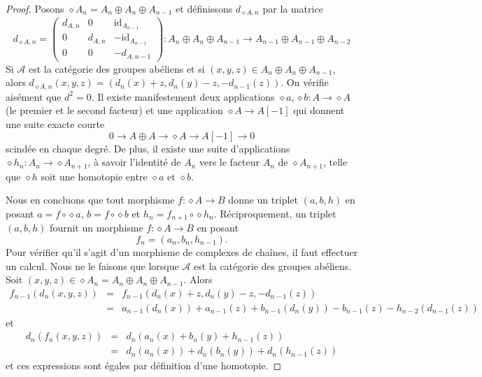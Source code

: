 \begin{proof}
Posons $\diamond A_n = A_n \oplus A_n \oplus A_{n - 1}$ et
définissons $d_{\diamond A, n}$ par la matrice
$$
d_{\diamond A, n}
=
\left(
\begin{matrix}
d_{A, n} & 0 & \text{id}_{A_{n - 1}} \\
0 & d_{A, n} & -\text{id}_{A_{n - 1}} \\
0 & 0 & -d_{A, n - 1}
\end{matrix}
\right) :
A_n \oplus A_n \oplus A_{n - 1} \to
A_{n - 1} \oplus A_{n - 1} \oplus A_{n - 2}
$$
Si $\mathcal{A}$ est la catégorie des groupes abéliens et si
$(x, y, z) \in A_n \oplus A_n \oplus A_{n - 1}$, alors
$d_{\diamond A, n}(x, y, z) = (d_n(x) + z, d_n(y) - z, -d_{n - 1}(z))$.
On vérifie aisément que $d^2 = 0$. Il existe manifestement deux applications
$\diamond a, \diamond b : A \to \diamond A$ (le premier et le second facteur)
et une application $\diamond A \to A[-1]$ qui donnent une suite exacte courte
$$
0 \to
A \oplus A \to
\diamond A \to
A[-1] \to
0
$$
scindée en chaque degré. De plus, il existe une suite d'applications
$\diamond h_n : A_n \to \diamond A_{n + 1}$, à savoir l'identité de $A_n$
vers le facteur $A_n$ de $\diamond A_{n + 1}$, telle que $\diamond h$ soit
une homotopie entre $\diamond a$ et $\diamond b$.

\medskip\noindent
Nous en concluons que tout morphisme $f : \diamond A \to B$ donne un triplet
$(a, b, h)$ en posant $a = f \circ \diamond a$,
$b = f \circ \diamond b$ et $h_n = f_{n + 1} \circ \diamond h_n$.
Réciproquement, un triplet $(a, b, h)$ fournit un morphisme
$f : \diamond A \to B$ en posant
$$
f_n = (a_n, b_n, h_{n - 1}).
$$
Pour vérifier qu'il s'agit d'un morphisme de complexes de chaînes, il faut
effectuer un calcul. Nous ne le faisons que lorsque $\mathcal{A}$ est la
catégorie des groupes abéliens. Soit
$(x, y, z) \in \diamond A_n = A_n \oplus A_n \oplus A_{n - 1}$. Alors
\begin{eqnarray*}
f_{n - 1}(d_n(x, y, z)) & = &
f_{n - 1}(d_n(x) + z, d_n(y) - z, -d_{n - 1}(z)) \\
& = &
a_{n - 1}(d_n(x)) + a_{n - 1}(z) + b_{n - 1}(d_n(y)) - b_{n - 1}(z) - h_{n - 2}(d_{n - 1}(z))
\end{eqnarray*}
et
\begin{eqnarray*}
d_n(f_n(x, y, z)) & = &
d_n(a_n(x) + b_n(y) + h_{n - 1}(z)) \\
& = &
d_n(a_n(x)) + d_n(b_n(y)) + d_n(h_{n - 1}(z))
\end{eqnarray*}
et ces expressions sont égales par définition d'une homotopie.
\end{proof}

